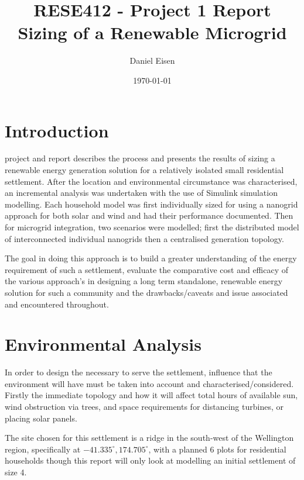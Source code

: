 \documentclass[journal]{IEEEtran}
\title{RESE412 - Project 1 Report \\ Sizing of a Renewable Microgrid}
\author{Daniel Eisen}
\date{\today}
\begin{document}
\onecolumn
\maketitle
\tableofcontents
\twocolumn
\section{Introduction}
   project and report describes the process and presents the results of sizing a renewable energy generation solution for a relatively isolated small residential settlement. After the location and environmental circumstance was characterised, an incremental analysis was undertaken with the use of Simulink simulation modelling. Each household model was first individually sized for using a nanogrid approach for both solar and wind and had their performance documented. Then for microgrid integration, two scenarios were modelled; first the distributed model of interconnected individual nanogrids then a centralised generation topology.
  
  The goal in doing this approach is to build a greater understanding of the energy requirement of such a settlement, evaluate the comparative cost and efficacy of the various approach's in designing a long term standalone, renewable energy solution for such a community and the drawbacks/caveats and issue associated and encountered throughout. 

\section{Environmental Analysis}
In order to design the necessary to serve the settlement, influence that the environment will have must be taken into account and characterised/considered. Firstly the immediate topology and how it will affect total hours of available sun, wind obstruction via trees, and space requirements for distancing turbines, or placing solar panels.

The site chosen for this settlement is a ridge in the south-west of the Wellington region, specifically at $-41.335^{\circ}, 174.705^{\circ}$, with a planned 6 plots for residential households though this report will only look at modelling an initial settlement of size 4.
\end{document}
